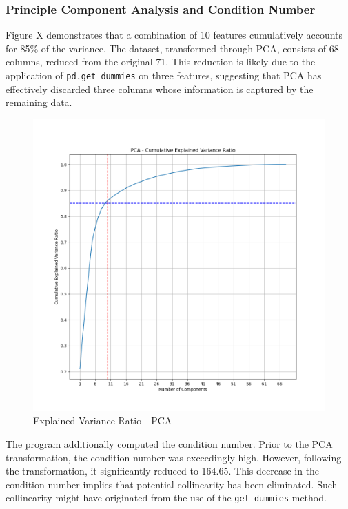 \subsubsection{Principle Component Analysis and Condition Number}
Figure X demonstrates that a combination of 10 features cumulatively accounts for 85\% of the variance. The dataset, transformed through PCA, consists of 68 columns, reduced from the original 71. This reduction is likely due to the application of \texttt{pd.get\_dummies} on three features, suggesting that PCA has effectively discarded three columns whose information is captured by the remaining data.

\begin{figure}[h]
\centering
\includegraphics[width=\textwidth]{docs//assets/pca.png}
\caption{Explained Variance Ratio - PCA}
\end{figure}

The program additionally computed the condition number. Prior to the PCA transformation, the condition number was exceedingly high. However, following the transformation, it significantly reduced to 164.65. This decrease in the condition number implies that potential collinearity has been eliminated. Such collinearity might have originated from the use of the \texttt{get\_dummies} method.



